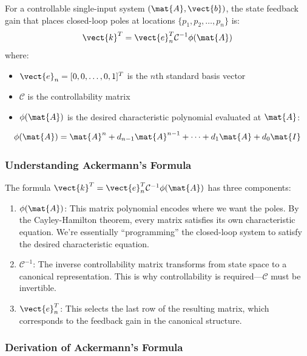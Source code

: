 \begin{theorem}
For a controllable single-input system $(\mat{A}, \vect{b})$, the state feedback gain that places closed-loop poles at locations $\{p_1, p_2, \ldots, p_n\}$ is:
\begin{equation}
\vect{k}^T = \vect{e}_n^T \mathcal{C}^{-1} \phi(\mat{A})
\label{eq:ackermann}
\end{equation}
where:
\begin{itemize}
    \item $\vect{e}_n = [0, 0, \ldots, 0, 1]^T$ is the $n$th standard basis vector
    \item $\mathcal{C}$ is the controllability matrix
    \item $\phi(\mat{A})$ is the desired characteristic polynomial evaluated at $\mat{A}$:
\end{itemize}
\begin{equation}
\phi(\mat{A}) = \mat{A}^n + d_{n-1}\mat{A}^{n-1} + \cdots + d_1\mat{A} + d_0\mat{I}
\label{eq:phi_matrix}
\end{equation}
\end{theorem}

\subsubsection{Understanding Ackermann's Formula}

The formula $\vect{k}^T = \vect{e}_n^T\mathcal{C}^{-1}\phi(\mat{A})$ has three components:

\begin{enumerate}
    \item $\phi(\mat{A})$: This matrix polynomial encodes where we want the poles. By the Cayley-Hamilton theorem, every matrix satisfies its own characteristic equation. We're essentially ``programming'' the closed-loop system to satisfy the desired characteristic equation.

    \item $\mathcal{C}^{-1}$: The inverse controllability matrix transforms from state space to a canonical representation. This is why controllability is required---$\mathcal{C}$ must be invertible.

    \item $\vect{e}_n^T$: This selects the last row of the resulting matrix, which corresponds to the feedback gain in the canonical structure.
\end{enumerate}

\subsubsection{Derivation of Ackermann's Formula}

